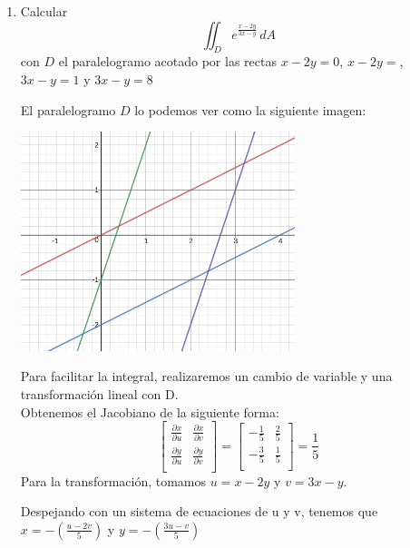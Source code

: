 \documentclass{article}
\begin{document}
\begin{enumerate}
        \item {
            Calcular
            \[
                \iint_{D}{e^{\frac{x-2y}{3x-y}}\,dA}
            \]
            con $D$ el paralelogramo acotado por las rectas $x-2y=0$, $x-2y=$,
            $3x-y=1$ y $3x-y=8$

            \color{azul}
            El paralelogramo $D$ lo podemos ver como la siguiente imagen:
            \begin{center}
                \includegraphics[width=8cm]{img/ejercicio2.png}
         	\end{center}

             Para facilitar la integral, realizaremos un cambio de variable y una
             transformación lineal con D.\\
             Obtenemos el Jacobiano de la siguiente forma:
             \[
                 \begin{bmatrix}
                     \frac{\partial x}{\partial u}&
                     \frac{\partial x}{\partial v}\\
                     \frac{\partial y}{\partial u}&
                     \frac{\partial y}{\partial v}\\
                 \end{bmatrix}
                 =
                 \begin{bmatrix}
                     -\frac{1}{5}
                     &\frac{2}{5}\\
                     -\frac{3}{5}
                     &\frac{1}{5}\\
                 \end{bmatrix}
                 =\frac{1}{5}
             \]
             Para la transformación, tomamos $u = x-2y$ y $v= 3x-y$.
            
             Despejando con un sistema de ecuaciones de u y v, tenemos que
             $x = -(\frac{u-2v}{5})$ y  $y = -(\frac{3u-v}{5})$

}
\end{enumerate}
\end{document}
